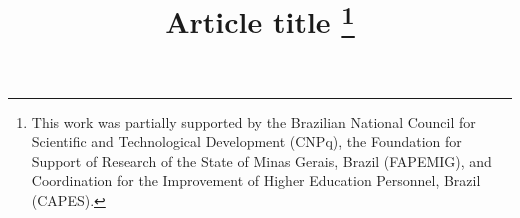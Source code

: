 
%
\RequirePackage{fix-cm}

\documentclass{svjour3}                      %


\smartqed  %

\usepackage{amssymb}
\usepackage{amsmath}
\usepackage[hmargin=3.4cm,vmargin=3cm]{geometry}
\usepackage{graphicx}
\usepackage[retainorgcmds]{IEEEtrantools}
\usepackage{hyperref}
\usepackage{rotating}
\usepackage{booktabs}
\usepackage{siunitx}
\usepackage{pdflscape}
\let\labelindent\relax
\usepackage{enumitem}
\usepackage{multirow}
\usepackage[normalem]{ulem}
\useunder{\uline}{\ul}{}
\usepackage{setspace} %
\usepackage[utf8]{inputenc}
\usepackage[linesnumbered, ruled, vlined]{algorithm2e}
\usepackage{rotating}
%

\usepackage{tkz-graph}

\usepackage{verbatim}
\usetikzlibrary{arrows,arrows.meta,shapes,decorations.pathmorphing, decorations.markings}



\title{Article title \thanks{This work was partially supported by the Brazilian National Council for Scientific and Technological Development (CNPq), the Foundation for Support of Research of the State of Minas Gerais, Brazil (FAPEMIG), and Coordination for the Improvement of Higher Education Personnel, Brazil (CAPES).}
}

